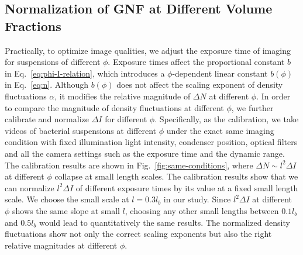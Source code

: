 %



\subsection{Normalization of GNF at Different Volume Fractions}

Practically, to optimize image qualities, we adjust the exposure time of imaging for suspensions of different $\phi$. Exposure times affect the proportional constant $b$ in Eq.~\ref{eq:phi-I-relation}, which introduces a $\phi$-dependent linear constant $b(\phi)$ in Eq.~\ref{eq:n}. Although $b(\phi)$ does not affect the scaling exponent of density fluctuations $\alpha$, it modifies the relative magnitude of $\Delta N$ at different $\phi$. In order to compare the magnitude of density fluctuations at different $\phi$,  we further calibrate and normalize $\Delta I$ for different $\phi$. Specifically, as the calibration, we take videos of bacterial suspensions at different $\phi$ under the exact same imaging condition with fixed illumination light intensity, condenser position, optical filters and all the camera settings such as the exposure time and the dynamic range. The calibration results are shown in Fig.~\ref{fig:same-conditions}, where $\Delta N \sim l^2 \Delta I$ at different $\phi$ collapse at small length scales. The calibration results show that we can normalize $l^2 \Delta I$ of different exposure times by its value at a fixed small length scale. We choose the small scale at $l = 0.3l_b$ in our study. Since $l^2 \Delta I$ at different $\phi$ shows the same slope at small $l$, choosing any other small lengths between $0.1l_b$ and $0.5l_b$ would lead to quantitatively the same results. The normalized density fluctuations show not only the correct scaling exponents but also the right relative magnitudes at different $\phi$.

